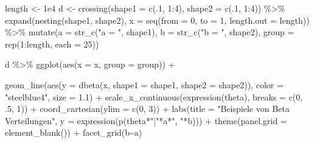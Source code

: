 \documentclass[]{tufte-handout}
\newenvironment{Shaded}{}{}
\newcommand{\AttributeTok}[1]{\textcolor[rgb]{0.49,0.56,0.16}{#1}}
\newcommand{\DecValTok}[1]{\textcolor[rgb]{0.25,0.63,0.44}{#1}}
\newcommand{\FloatTok}[1]{\textcolor[rgb]{0.25,0.63,0.44}{#1}}
\newcommand{\FunctionTok}[1]{\textcolor[rgb]{0.02,0.16,0.49}{#1}}
\newcommand{\NormalTok}[1]{#1}
\newcommand{\OtherTok}[1]{\textcolor[rgb]{0.00,0.44,0.13}{#1}}
\newcommand{\SpecialCharTok}[1]{\textcolor[rgb]{0.25,0.44,0.63}{#1}}
\newcommand{\StringTok}[1]{\textcolor[rgb]{0.25,0.44,0.63}{#1}}
\begin{document}
\begin{Shaded}
\begin{Highlighting}[]
\NormalTok{length }\OtherTok{\textless{}{-}} \FloatTok{1e4}
\NormalTok{d }\OtherTok{\textless{}{-}} \FunctionTok{crossing}\NormalTok{(}\AttributeTok{shape1 =} \FunctionTok{c}\NormalTok{(.}\DecValTok{1}\NormalTok{, }\DecValTok{1}\SpecialCharTok{:}\DecValTok{4}\NormalTok{),}
           \AttributeTok{shape2 =} \FunctionTok{c}\NormalTok{(.}\DecValTok{1}\NormalTok{, }\DecValTok{1}\SpecialCharTok{:}\DecValTok{4}\NormalTok{)) }\SpecialCharTok{\%\textgreater{}\%}
  \FunctionTok{expand}\NormalTok{(}\FunctionTok{nesting}\NormalTok{(shape1, shape2),}
         \AttributeTok{x =} \FunctionTok{seq}\NormalTok{(}\AttributeTok{from =} \DecValTok{0}\NormalTok{, }\AttributeTok{to =} \DecValTok{1}\NormalTok{, }\AttributeTok{length.out =}\NormalTok{ length)) }\SpecialCharTok{\%\textgreater{}\%} 
  \FunctionTok{mutate}\NormalTok{(}\AttributeTok{a =} \FunctionTok{str\_c}\NormalTok{(}\StringTok{"a = "}\NormalTok{, shape1),}
         \AttributeTok{b =} \FunctionTok{str\_c}\NormalTok{(}\StringTok{"b = "}\NormalTok{, shape2),}
         \AttributeTok{group =} \FunctionTok{rep}\NormalTok{(}\DecValTok{1}\SpecialCharTok{:}\NormalTok{length, }\AttributeTok{each =} \DecValTok{25}\NormalTok{))}
\end{Highlighting}
\end{Shaded}

\begin{Shaded}
\begin{Highlighting}[]
\NormalTok{d }\SpecialCharTok{\%\textgreater{}\%} 
  \FunctionTok{ggplot}\NormalTok{(}\FunctionTok{aes}\NormalTok{(}\AttributeTok{x =}\NormalTok{ x, }\AttributeTok{group =}\NormalTok{ group)) }\SpecialCharTok{+}
  
  \FunctionTok{geom\_line}\NormalTok{(}\FunctionTok{aes}\NormalTok{(}\AttributeTok{y =} \FunctionTok{dbeta}\NormalTok{(x, }\AttributeTok{shape1 =}\NormalTok{ shape1, }\AttributeTok{shape2 =}\NormalTok{ shape2)),}
            \AttributeTok{color =} \StringTok{"steelblue4"}\NormalTok{, }\AttributeTok{size =} \FloatTok{1.1}\NormalTok{) }\SpecialCharTok{+}
  \FunctionTok{scale\_x\_continuous}\NormalTok{(}\FunctionTok{expression}\NormalTok{(theta), }\AttributeTok{breaks =} \FunctionTok{c}\NormalTok{(}\DecValTok{0}\NormalTok{, .}\DecValTok{5}\NormalTok{, }\DecValTok{1}\NormalTok{)) }\SpecialCharTok{+}
  \FunctionTok{coord\_cartesian}\NormalTok{(}\AttributeTok{ylim =} \FunctionTok{c}\NormalTok{(}\DecValTok{0}\NormalTok{, }\DecValTok{3}\NormalTok{)) }\SpecialCharTok{+}
  \FunctionTok{labs}\NormalTok{(}\AttributeTok{title =} \StringTok{"Beispiele von Beta Verteilungen"}\NormalTok{,}
       \AttributeTok{y =} \FunctionTok{expression}\NormalTok{(}\FunctionTok{p}\NormalTok{(theta}\SpecialCharTok{*}\StringTok{"|"}\SpecialCharTok{*}\NormalTok{a}\SpecialCharTok{*}\StringTok{", "}\SpecialCharTok{*}\NormalTok{b))) }\SpecialCharTok{+}
  \FunctionTok{theme}\NormalTok{(}\AttributeTok{panel.grid =} \FunctionTok{element\_blank}\NormalTok{()) }\SpecialCharTok{+}
  \FunctionTok{facet\_grid}\NormalTok{(b}\SpecialCharTok{\textasciitilde{}}\NormalTok{a)}
\end{Highlighting}
\end{Shaded}
\end{document}

